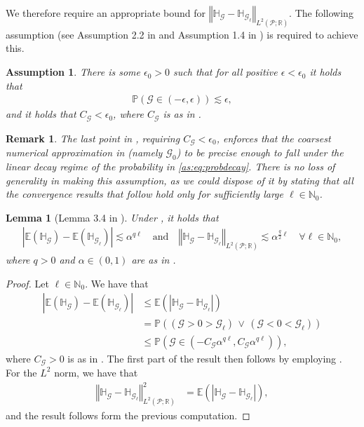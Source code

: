 \documentclass{article}
\newtheorem{remark}[theorem]{Remark}
\newtheorem{lemma}[theorem]{Lemma}
\newtheorem{assumption}[theorem]{Assumption}
\newcommand{\cG}{\mathcal{G}}
\newcommand{\cP}{\mathcal{P}}
\newcommand{\IE}{\mathbb{E}}
\newcommand{\IH}{\mathbb{H}}
\newcommand{\IN}{\mathbb{N}}
\newcommand{\IP}{\mathbb{P}}
\newcommand{\IR}{\mathbb{R}}
\newcommand{\norm}[2]{{\left\Vert #2 \right\Vert}_{#1}}
\newcommand{\abs}[1]{{\left\vert #1 \right\vert}}
\newcommand{\lp}[2]{{L}^{#1}( #2 )}
\newcommand{\probspacesum}{\cP}
\theoremstyle{definition}
\begin{document}
We therefore require an appropriate bound for $\norm{\lp{2}{\cP;\IR}}{\IH_\cG-\IH_{\cG_\ell}}$.
The following assumption (see Assumption 2.2 in \cite{elfversonMultilevelMonteCarlo2016} and Assumption 1.4 in
\cite{haji-aliAdaptiveMultilevelMonte2022})
is required to achieve this.
\begin{assumption}
  \label{as:probreg}
  There is some $\epsilon_0>0$ such that for all positive $\epsilon < \epsilon_0$ it holds that
  \begin{align}
    \label{as:eq:probdecay}
    \IP(\cG \in (-\epsilon,\epsilon)) \lesssim \epsilon,
  \end{align}
  and it holds that $C_\cG<\epsilon_0$, where $C_\cG$ is as in .
\end{assumption}
\begin{remark}
  The last point in , requiring $C_\cG<\epsilon_0$, enforces that the coarsest numerical approximation
  in  (namely $\cG_0$) to be precise enough to fall under the linear decay regime of the probability in
  \cref{as:eq:probdecay}. There is no loss of generality in making this assumption, as we could dispose of it
  by stating that all the convergence results that follow hold only for sufficiently large $\ell\in\IN_0$.
\end{remark}
\begin{lemma}[Lemma 3.4 in \cite{elfversonMultilevelMonteCarlo2016}]
  \label{lem:l2proberror}
  Under , it holds that 
  \begin{align*}
    \abs{\IE(\IH_{\cG})-\IE(\IH_{\cG_\ell})}\lesssim \alpha^{q\ell}\quad\text{and}\quad
      \norm{\lp{2}{\cP;\IR}}{\IH_{\cG}-\IH_{\cG_\ell}}\lesssim \alpha^{\frac{q}{2}\ell}\quad\forall\ell\in\IN_0,
  \end{align*}
  where $q>0$ and $\alpha\in(0,1)$ are as in .
\end{lemma}
\begin{proof}
  Let $\ell\in\IN_0$. We have that
\begin{align*}
\abs{\IE(\IH_{\cG})-\IE(\IH_{\cG_\ell})}
  &\leq\IE\left(\abs{\IH_{\cG}-\IH_{\cG_\ell}}\right)\\
  &=\IP((\cG > 0 > \cG_\ell)\,\lor\,(\cG < 0 < \cG_\ell))\\
  &\leq\IP(\cG \in (-C_\cG\alpha^{q\ell}, C_\cG\alpha^{q\ell})),
\end{align*}
where $C_\cG>0$ is as in . The first part of the result then follows by employing .
For the $L^2$ norm, we have that
\begin{align*}
  \norm{\lp{2}{\probspacesum;\IR}}{\IH_{\cG}-\IH_{\cG_\ell}}^2
  &=\IE\left(\abs{\IH_{\cG}-\IH_{\cG_\ell}}\right),
\end{align*}
and the result follows form the previous computation.
\end{proof}
\end{document}
